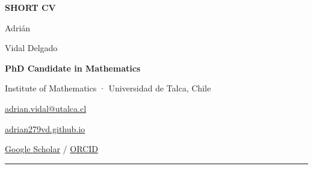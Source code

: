 \documentclass[10pt,a4paper]{article}
\begin{document}
\begin{minipage}[t]{0.69\textwidth}
  {\sffamily\fontsize{8}{11}\selectfont\color{ochre}\bfseries{}SHORT CV}\par\vspace{8pt}
  {\fontsize{28}{30}\selectfont\color{deepblue}Adrián\par Vidal Delgado}\par\vspace{7pt}
  {\sffamily\fontsize{10.8}{13}\selectfont\color{ink}\bfseries PhD Candidate in Mathematics}\par
  {\sffamily\fontsize{9.3}{13}\selectfont\color{quiet}Institute of Mathematics · Universidad de Talca, Chile}
\end{minipage}%
\hfill
\begin{minipage}[t]{0.29\textwidth}
  \raggedleft
  \vspace{11pt}
  {\sffamily\fontsize{9.05}{13}\selectfont
  \href{mailto:adrian.vidal@utalca.cl}{adrian.vidal@utalca.cl}\par\vspace{4pt}
  \href{https://adrian279vd.github.io/}{adrian279vd.github.io}\par\vspace{4pt}
  \href{https://scholar.google.com/citations?user=HVv9miEAAAAJ\&hl=en}{Google Scholar}\; /\; \href{https://orcid.org/0009-0002-2338-5591}{ORCID}\par}
\end{minipage}

\vspace{10pt}
{\color{deepblue}\rule{\textwidth}{1.15pt}}
\vspace{5pt}
\end{document}
